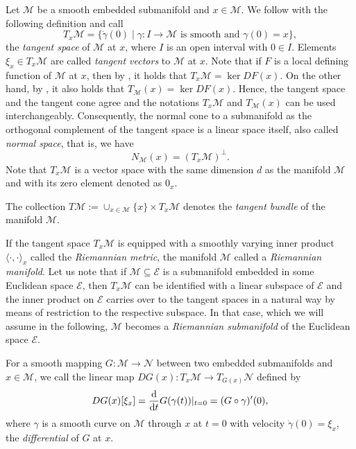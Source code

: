 \documentclass[a4paper, 12pt]{article}
\numberwithin{equation}{section}
\theoremstyle{bolddef}
\theoremstyle{definition}
\theoremstyle{boldplain}
\newcommand{\X}{\mathcal{E}}
\begin{document}
Let $\mathcal{M}$ be a smooth embedded submanifold and $x \in \mathcal{M}$. We follow \cite{Boumal2023} with the following definition and call 
\begin{equation*}
	T_x \mathcal{M} = \{\dot \gamma(0) \mid \gamma : I \to \mathcal{M} \text{ is smooth and } \gamma(0) = x\},
\end{equation*}
the \emph{tangent space} of $\mathcal{M}$ at $x$, where $I$ is an open interval with $0 \in I$. Elements $\xi_x \in T_x\mathcal{M}$ are called \emph{tangent vectors} to $\mathcal{M}$ at $x$. Note that if $F$ is a local defining function of $\mathcal{M}$ at $x$, then by \cite[Theorem 3.15]{Boumal2023}, it holds that $T_x\mathcal{M} = \ker DF(x)$. On the other hand, by \cite[Example 6.8]{RockafellarWets2009}, it also holds that $T_\mathcal{M}(x) = \ker DF(x)$. Hence, the tangent space and the tangent cone agree and the notations $T_x \mathcal{M}$ and $T_\mathcal{M}(x)$ can be used interchangeably. Consequently, the normal cone to a submanifold as the orthogonal complement of the tangent space is a linear space itself, also called \emph{normal space}, that is, we have
\begin{equation*}
	N_\mathcal{M}(x) = (T_x \mathcal{M})^\perp.
\end{equation*}
Note that $T_x \mathcal{M}$ is a vector space with the same dimension $d$ as the manifold $\mathcal{M}$ and with its zero element denoted as $0_x$. 

The collection $T\mathcal{M}:= \cup_{x \in \mathcal{M}} \{x\} \times T_x\mathcal{M}$ denotes the \emph{tangent bundle} of the manifold $\mathcal{M}$.

If the tangent space $T_x \mathcal{M}$ is equipped with a smoothly varying inner product $\langle \cdot, \cdot \rangle_x$ called the \emph{Riemannian metric}, the manifold $\mathcal{M}$ called a \emph{Riemannian manifold}. Let us note that if $\mathcal{M} \subseteq \mathcal{E}$ is a submanifold embedded in some Euclidean space $\mathcal{E}$, then $T_x \mathcal{M}$ can be identified with a linear subspace of $\mathcal{E}$ and the inner product on $\mathcal{E}$ carries over to the tangent spaces in a natural way by means of restriction to the respective subspace. In that case, which we will assume in the following, $\mathcal{M}$ becomes a \emph{Riemannian submanifold} of the Euclidean space $\X$.

For a smooth mapping $G: \mathcal{M} \to \mathcal{N}$ between two embedded submanifolds and $x \in \mathcal{M}$, we call the linear map $DG(x): T_x\mathcal{M} \to T_{G(x)} \mathcal{N}$ defined by
\begin{equation*}
	DG(x)[\xi_x] = \frac{\mathrm{d}}{\mathrm{d} t} G(\gamma(t))\large|_{t = 0} = (G \circ \gamma)'(0),
\end{equation*}
where $\gamma$ is a smooth curve on $\mathcal{M}$ through $x$ at $t=0$ with velocity $\dot \gamma(0) = \xi_x$, the \emph{differential} of $G$ at $x$.
\end{document}
